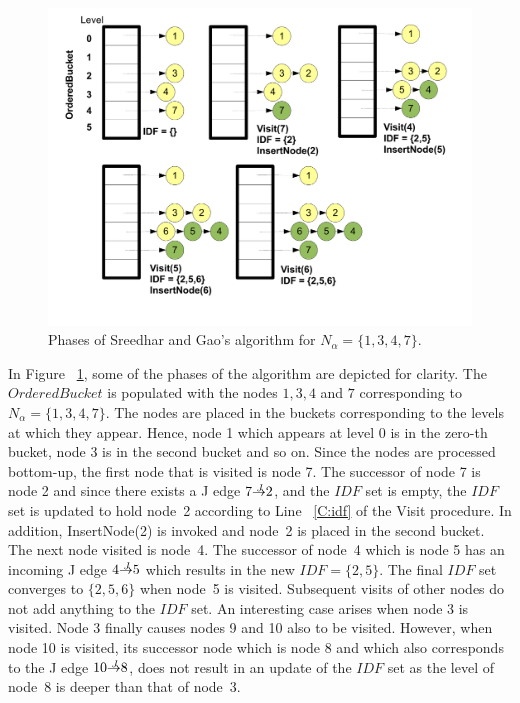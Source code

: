 {    \begin{figure}[htb]
    \centerline{\includegraphics[scale=0.3]{sreedhargao.pdf}}
    \caption{Phases of Sreedhar and Gao's algorithm for $N_\alpha=\{1,3,4,7\}$.}
    \label{fig:sreedhargao}
    \end{figure} 

In Figure ~\ref{fig:sreedhargao}, some of the phases of the algorithm are depicted for clarity. The $OrderedBucket$
is populated with the nodes $1,3,4$ and $7$ corresponding to $N_\alpha=\{1,3,4,7\}$. The nodes are
placed in the buckets corresponding to the levels at which they appear. Hence, node 1 which appears at 
level 0 is in the zero-th bucket, node 3 is in the second bucket and so on. Since the
nodes are processed bottom-up, the first node that is visited is node 7. The successor of node 7 is node
2 and since there exists a J edge $7 \st{J} 2$, and the $IDF$ set is empty, the $IDF$ set is updated
to hold node~2 according to Line ~\ref{C:idf} of the Visit procedure. In addition, InsertNode(2) is invoked and 
node~2 is placed in the second bucket. The next node visited is node~4. The successor of node~4 which is node
5 has an incoming J edge $4 \st{J} 5$ which results in the new $IDF = \{2,5\}$. The final $IDF$ set converges
to $\{2,5,6\}$ when node~5 is visited. Subsequent visits of other nodes do not add anything to the
$IDF$ set. An interesting case arises when node 3 is visited. Node 3 finally causes nodes 9 and 10 also 
to be visited. However, when node 10 is visited, its successor node which is node 8 and which also 
corresponds to the J edge $10 \st{J} 8$, does not result in an update of the $IDF$ set as the level of
node~8 is deeper than that of node~3.


}
